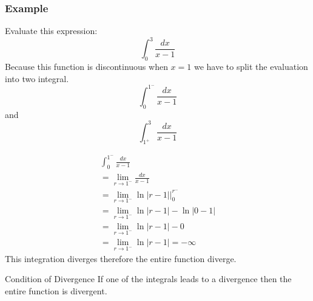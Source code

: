 \documentclass[letterpaper,10pt,twoside,twocolumn,openany]{book}
\begin{document}
\subsubsection{Example}
Evaluate this expression:
$$
    \int_0^3 \frac{dx}{x-1}
$$
Because this function is discontinuous when $x = 1$ we have to split the evaluation into two integral.
$$
    \int_0^{1^-} \frac{dx}{x-1}
$$
and
$$
    \int_{1^+}^3 \frac{dx}{x-1}
$$
\newpage
{}
\begin{gather*}
    \int_0^{1^-} \frac{dx}{x-1}\\ 
    = \lim_{r \to 1^-} \frac{dx}{x-1}\\ 
    = \lim_{r \to 1^-} \ln|r-1|\biggl|_0^{r^-}\\ 
    = \lim_{r \to 1^-} \ln|r-1| - \ln|0-1|\\ 
    = \lim_{r \to 1^-} \ln|r-1| - 0\\ 
    = \lim_{r \to 1^-} \ln|r-1| = -\infty
\end{gather*}    
This integration diverges therefore the entire function diverge.
\begin{commentbox}{Condition of Divergence}
    If one of the integrals leads to a divergence then the entire function is divergent.
\end{commentbox}
\end{document}
